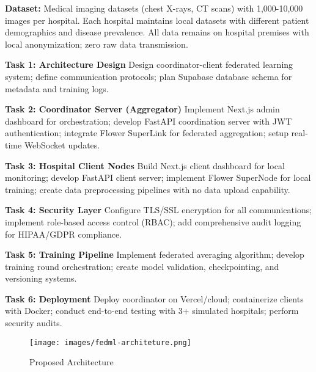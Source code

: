 \textbf{Dataset:} Medical imaging datasets (chest X-rays, CT scans) with 1,000-10,000 images per hospital. Each hospital maintains local datasets with different patient demographics and disease prevalence. All data remains on hospital premises with local anonymization; zero raw data transmission.

\textbf{Task 1: Architecture Design}
Design coordinator-client federated learning system; define communication protocols; plan Supabase database schema for metadata and training logs.

\textbf{Task 2: Coordinator Server (Aggregator)}
Implement Next.js admin dashboard for orchestration; develop FastAPI coordination server with JWT authentication; integrate Flower SuperLink for federated aggregation; setup real-time WebSocket updates.

\textbf{Task 3: Hospital Client Nodes}
Build Next.js client dashboard for local monitoring; develop FastAPI client server; implement Flower SuperNode for local training; create data preprocessing pipelines with no data upload capability.

\textbf{Task 4: Security Layer}
Configure TLS/SSL encryption for all communications; implement role-based access control (RBAC); add comprehensive audit logging for HIPAA/GDPR compliance.

\textbf{Task 5: Training Pipeline}
Implement federated averaging algorithm; develop training round orchestration; create model validation, checkpointing, and versioning systems.

\textbf{Task 6: Deployment}
Deploy coordinator on Vercel/cloud; containerize clients with Docker; conduct end-to-end testing with 3+ simulated hospitals; perform security audits.

\begin{figure}[H]
    \centering
    \texttt{[image: images/fedml-architeture.png]}
    \caption{Proposed Architecture}
\end{figure}
